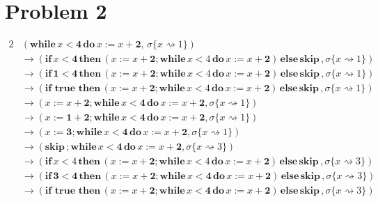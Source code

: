 \documentclass[a4papers]{ctexart}
\begin{document}
\section{Problem 2}
\begin{alignat*}{2}
    & (\mathbf{while}\,  x < \mathbf{4} \, \mathbf{do}\, x:=x+  \mathbf{2},\, \sigma\{x \rightsquigarrow 1 \})    \\
    &\rightarrow (  \mathbf{if}\,  x <\mathbf{4}  \, \mathbf{then}\,  (x:=x+  \mathbf{2};\mathbf{while}\,  x<4 \, \mathbf{do}\, x:=x+  \mathbf{2})\, \mathbf{else}\,  \mathbf{skip}\, ,\sigma\{x \rightsquigarrow 1 \})\\
    &\rightarrow (  \mathbf{if}\,  \mathbf{1} <\mathbf{4}  \, \mathbf{then}\,  (x:=x+  \mathbf{2};\mathbf{while}\,  x<4 \, \mathbf{do}\, x:=x+  \mathbf{2})\, \mathbf{else}\,  \mathbf{skip}\, ,\sigma\{x \rightsquigarrow 1 \})\\
    &\rightarrow (  \mathbf{if}\,   \, \mathbf{true}\,   \, \mathbf{then}\,  (x:=x+  \mathbf{2};\mathbf{while}\,  x<4 \, \mathbf{do}\, x:=x+  \mathbf{2})\, \mathbf{else}\,  \mathbf{skip}\, ,\sigma\{x \rightsquigarrow 1 \})\\
    &\rightarrow ( x:=x+  \mathbf{2};\mathbf{while}\,  x<\mathbf{4} \, \mathbf{do}\, x:=x+  \mathbf{2},\sigma\{x \rightsquigarrow 1 \})\\
    &\rightarrow ( x:=\mathbf{1}+  \mathbf{2};\mathbf{while}\,  x<\mathbf{4} \, \mathbf{do}\, x:=x+  \mathbf{2},\sigma\{x \rightsquigarrow 1 \})\\
    &\rightarrow ( x:=  \mathbf{3};\mathbf{while}\,  x<\mathbf{4} \, \mathbf{do}\, x:=x+  \mathbf{2},\sigma\{x \rightsquigarrow 1 \})\\
    &\rightarrow (\mathbf{skip}\, ;\mathbf{while}\,  x<\mathbf{4} \, \mathbf{do}\, x:=x+  \mathbf{2},\sigma\{x \rightsquigarrow 3 \})\\
    &\rightarrow (  \mathbf{if}\,  x <4  \, \mathbf{then}\,  (x:=x+  \mathbf{2};\mathbf{while}\,  x<4 \, \mathbf{do}\, x:=x+  \mathbf{2})\, \mathbf{else}\,  \mathbf{skip}\, ,\sigma\{x \rightsquigarrow 3 \})\\
    &\rightarrow (  \mathbf{if}\,    \mathbf{3} <\mathbf{4}  \, \mathbf{then}\,  (x:=x+  \mathbf{2};\mathbf{while}\,  x<\mathbf{4} \, \mathbf{do}\, x:=x+  \mathbf{2})\, \mathbf{else}\,  \mathbf{skip}\, ,\sigma\{x \rightsquigarrow 3 \})\\
    &\rightarrow (  \mathbf{if}\,   \, \mathbf{true}\,   \, \mathbf{then}\,  (x:=x+  \mathbf{2};\mathbf{while}\,  x<\mathbf{4} \, \mathbf{do}\, x:=x+  \mathbf{2})\, \mathbf{else}\,  \mathbf{skip}\, ,\sigma\{x \rightsquigarrow 3 \})\\

\end{alignat*}
\end{document}
